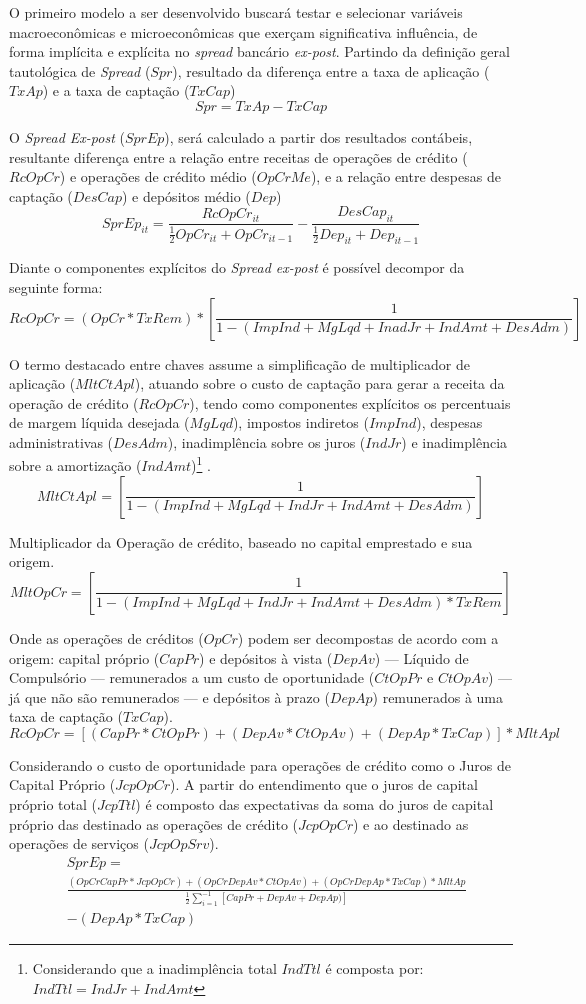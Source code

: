 \documentclass[12pt,openright,oneside,a4paper,chapter=TITLE,section=TITLE,subsection=TITLE,english,french,spanish,portugues,sumario=tradicional]{abntex2}
\begin{document}
O primeiro modelo a ser desenvolvido buscará testar e selecionar variáveis macroeconômicas e microeconômicas que exerçam significativa influência, de forma implícita e explícita no \emph{spread} bancário \emph{ex-post}. Partindo da definição geral tautológica de \emph{Spread} (\(Spr\)), resultado da diferença entre a taxa de aplicação (\(TxAp\)) e a taxa de captação (\(TxCap\))
\[
Spr = TxAp - TxCap 
\]

O \emph{Spread Ex-post} (\(SprEp\)), será calculado a partir dos resultados contábeis, resultante diferença entre a relação entre receitas de operações de crédito (\(RcOpCr\)) e operações de crédito médio (\(OpCrMe\)), e a relação entre despesas de captação (\(DesCap\)) e depósitos médio (\(Dep\))
\[
SprEp_{it} = \frac{RcOpCr_{it}}{\frac{1}{2}OpCr_{it} + OpCr_{it-1} } - \frac{DesCap_{it}}{\frac{1}{2}Dep_{it} + Dep_{it-1}}
\]

Diante o componentes explícitos do \emph{Spread ex-post} é possível decompor da seguinte forma:
\[
RcOpCr = (OpCr * TxRem) * [\frac{1}{1-(ImpInd + MgLqd + InadJr + IndAmt + DesAdm)}]
\]

O termo destacado entre chaves assume a simplificação de multiplicador de aplicação (\(MltCtApl\)), atuando sobre o custo de captação para gerar a receita da operação de crédito (\(RcOpCr\)), tendo como componentes explícitos os percentuais de margem líquida desejada (\(MgLqd\)), impostos indiretos (\(ImpInd\)), despesas administrativas (\(DesAdm\)), inadimplência sobre os juros (\(IndJr\)) e inadimplência sobre a amortização (\(IndAmt\))\footnote{Considerando que a inadimplência total $IndTtl$ é composta por: $IndTtl = IndJr + IndAmt$} .
\[
MltCtApl_{} = [\frac{1}{1-(ImpInd + MgLqd + IndJr + IndAmt + DesAdm)}]
\]

Multiplicador da Operação de crédito, baseado no capital emprestado e sua origem.
\[
MltOpCr = [\frac{1}{1-(ImpInd + MgLqd + IndJr + IndAmt + DesAdm) * TxRem}]
\]

Onde as operações de créditos (\(OpCr\)) podem ser decompostas de acordo com a origem: capital próprio (\(CapPr\)) e depósitos à vista (\(DepAv\)) --- Líquido de Compulsório --- remunerados a um custo de oportunidade (\(CtOpPr\) e \(CtOpAv\)) --- já que não são remunerados --- e depósitos à prazo (\(DepAp\)) remunerados à uma taxa de captação (\(TxCap\)).
\[
RcOpCr = [(CapPr * CtOpPr) + (DepAv * CtOpAv) + (DepAp * TxCap)] * MltApl
\]

Considerando o custo de oportunidade para operações de crédito como o Juros de Capital Próprio (\(JcpOpCr\)). A partir do entendimento que o juros de capital próprio total (\(JcpTtl\)) é composto das expectativas da soma do juros de capital próprio das destinado as operações de crédito (\(JcpOpCr\)) e ao destinado as operações de serviços (\(JcpOpSrv\)).
\[\begin{aligned}
& SprEp = \\
& \frac{(OpCrCapPr * JcpOpCr) + (OpCrDepAv * CtOpAv) + (OpCrDepAp * TxCap) * MltAp}{\frac{1}{2}\sum_{i=1}^{-1}[CapPr + DepAv + DepAp )]} 
\\ & - (DepAp*TxCap)
\end{aligned}\]
\end{document}
